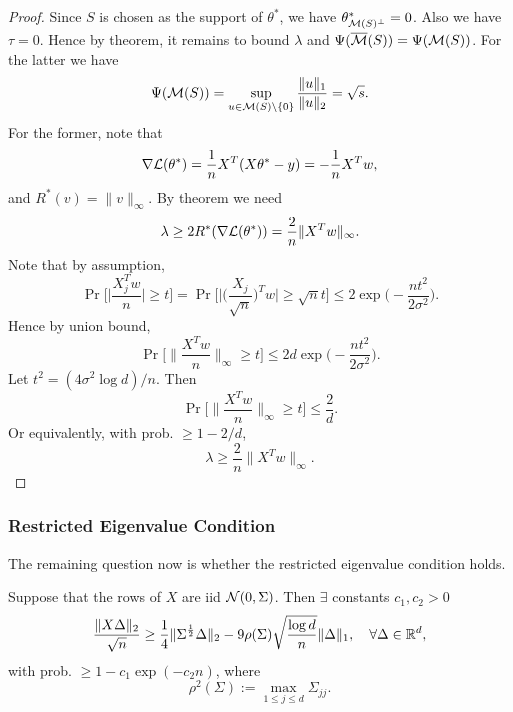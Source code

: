 \begin{proof}
    Since $S$ is chosen as the support of $\theta^*$,
    we have $\theta^*_{\mathcal{M}(S)^\perp}=0$.
    Also we have $\tau=0$.
    Hence by theorem,
    it remains to bound $\lambda$ and $\Psi({\overline{\mathcal{M}}}(S))=\Psi(\mathcal{M}(S))$.
    For the latter we have
    \begin{equation}
        \Psi(\mathcal{M}(S)) = \sup_{u\in\mathcal{M}(S)\backslash\{0\}}\frac{\|u\|_1}{\|u\|_2}=\sqrt{s}.
    \end{equation}
    For the former, note that
    \begin{equation}
        \nabla\mathcal{L}(\theta^*) = \frac{1}{n}X^T(X\theta^*-y)=-\frac{1}{n}X^Tw,
    \end{equation}
    and $R^*(v)=\|v\|_\infty$.
    By theorem we need
    \begin{equation}
        \lambda\ge 2R^*(\nabla\mathcal{L}(\theta^*))=\frac{2}{n}\|X^Tw\|_\infty.
    \end{equation}
    Note that by assumption,
    \begin{equation}
        \Pr\bigg[\bigg|\frac{X_j^T w}{n}\bigg|\ge t\bigg]
            = \Pr\bigg[\bigg|\bigg(\frac{X_j}{\sqrt{n}}\bigg)^T w\bigg|\ge \sqrt{n}t\bigg]
            \le 2\exp\bigg(\!\!-\frac{nt^2}{2\sigma^2}\bigg).
    \end{equation}
    Hence by union bound,
    \begin{equation}
        \Pr\bigg[\bigg\|\frac{X^T w}{n}\bigg\|_\infty\ge t\bigg]
             \le 2d\exp\bigg(\!\!-\frac{nt^2}{2\sigma^2}\bigg).
    \end{equation}
    Let $t^2=(4\sigma^2\log d)/n$. Then
    \begin{equation}
        \Pr\bigg[\bigg\|\frac{X^T w}{n}\bigg\|_\infty\ge t\bigg] \le \frac{2}{d}.
    \end{equation}
    Or equivalently, with prob. $\ge 1-2/d$,
    \begin{equation}
        \lambda\ge \frac{2}{n}\|X^Tw\|_\infty.
    \end{equation}
\end{proof}

\subsubsection{Restricted Eigenvalue Condition}

The remaining question now is whether the restricted eigenvalue condition holds.

\begin{thm}
Suppose that the rows of $X$ are iid $\mathcal{N}(0,\Sigma)$.
Then $\exists$ constants $c_1,c_2>0$ \st
\begin{equation}
    \frac{\|X\Delta\|_2}{\sqrt{n}}\ge\frac{1}{4}\|\Sigma^{\frac{1}{2}}\Delta\|_2-9\rho(\Sigma)\sqrt{\frac{\log d}{n}}\|\Delta\|_1, \quad \forall\Delta\in{\mathbb{R}}^d,
\end{equation}
with prob. $\ge 1-c_1\exp(-c_2n)$, where
\begin{equation}
    \rho^2(\Sigma):=\max_{1\le j\le d}\Sigma_{jj}.
\end{equation}
\end{thm}

